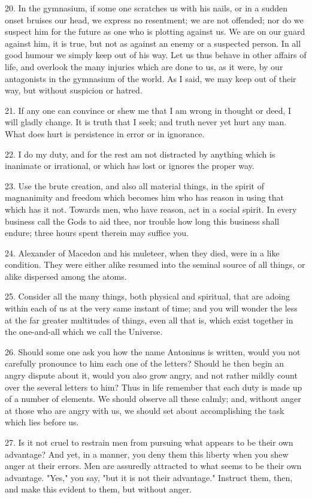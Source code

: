 \documentclass{book}
\begin{document}
20. In the gymnasium, if some one scratches us with his nails, or in a
sudden onset bruises our head, we express no resentment; we are not
offended; nor do we suspect him for the future as one who is plotting
against us. We are on our guard against him, it is true, but not as
against an enemy or a suspected person. In all good humour we simply
keep out of his way. Let us thus behave in other affairs of life, and
overlook the many injuries which are done to us, as it were, by our
antagonists in the gymnasium of the world. As I said, we may keep out
of their way, but without suspicion or hatred.

21. If any one can convince or shew me that I am wrong in thought or
deed, I will gladly change. It is truth that I seek; and truth never
yet hurt any man. What does hurt is persistence in error or in
ignorance.

22. I do my duty, and for the rest am not distracted by anything which
is inanimate or irrational, or which has lost or ignores the proper
way.

23. Use the brute creation, and also all material things, in the
spirit of magnanimity and freedom which becomes him who has reason in
using that which has it not. Towards men, who have reason, act in a
social spirit. In every business call the Gods to aid thee, nor
trouble how long this business shall endure; three hours spent therein
may suffice you.

24. Alexander of Macedon and his muleteer, when they died, were in a
like condition. They were either alike resumed into the seminal source
of all things, or alike dispersed among the atoms.

25. Consider all the many things, both physical and spiritual, that
are adoing within each of us at the very same instant of time; and you
will wonder the less at the far greater multitudes of things, even all
that is, which exist together in the one-and-all which we call the
Universe.

26. Should some one ask you how the name Antoninus is written, would
you not carefully pronounce to him each one of the letters? Should he
then begin an angry dispute about it, would you also grow angry, and
not rather mildly count over the several letters to him? Thus in life
remember that each duty is made up of a number of elements. We should
observe all these calmly; and, without anger at those who are angry
with us, we should set about accomplishing the task which lies before
us.

27. Is it not cruel to restrain men from pursuing what appears to be
their own advantage? And yet, in a manner, you deny them this liberty
when you shew anger at their errors. Men are assuredly attracted to
what seems to be their own advantage. "Yes," you say, "but it is not
their advantage." Instruct them, then, and make this evident to them,
but without anger.
\end{document}
